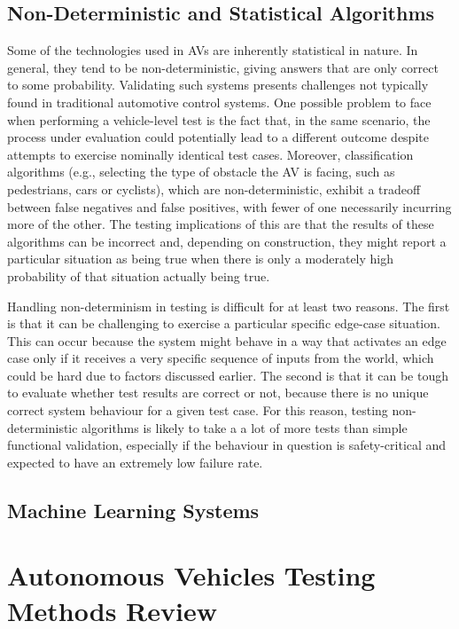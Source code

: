 \documentclass[a4paper, 10pt]{article}
\begin{document}
\subsection{Non-Deterministic and Statistical Algorithms}
Some of the technologies used in AVs are inherently statistical in nature. In general, they tend to be non-deterministic, giving answers that are only correct to some probability. Validating such systems presents challenges not typically found in traditional automotive control systems. One possible problem to face when performing a vehicle-level test is the fact that, in the same scenario, the process under evaluation could potentially lead to a different outcome despite attempts to exercise nominally identical test cases. Moreover, classification algorithms (e.g., selecting the type of obstacle the AV is facing, such as pedestrians, cars or cyclists), which are non-deterministic, exhibit a tradeoff between false negatives and false positives, with fewer of one necessarily incurring more of the other. The testing implications of this are that the results of these algorithms can be incorrect and, depending on construction, they might report a particular situation as being true when there is only a moderately high probability of that situation actually being true.

Handling non-determinism in testing is difficult for at least two reasons. The first is that it can be challenging to exercise a particular specific edge-case situation. This can occur because the system might behave in a way that activates an edge case only if it receives a very specific sequence of inputs from the world, which could be hard due to factors discussed earlier. The second is that it can be tough to evaluate whether test results are correct or not, because there is no unique correct system behaviour for a given test case. For this reason, testing non-deterministic algorithms is likely to take a a lot of more tests than simple functional validation, especially if the behaviour in question is safety-critical and expected to have an extremely low failure rate.


\subsection{Machine Learning Systems}

\section{Autonomous Vehicles Testing Methods Review~\cite{methods}}




\end{document}
